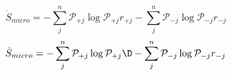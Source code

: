 \begin{equation}
\dot S_{micro} = -\sum_j^n\mathcal P_{+j}\log\mathcal P_{+j}r_{+j} -\sum_j^n\mathcal P_{-j}\log\mathcal P_{-j} r_{-j}
\end{equation}
\begin{equation}
\dot S_{micro} = -\sum_j^n\mathcal P_{+j}\log\mathcal P_{+j}\D -\sum_j^n\mathcal P_{-j}\log\mathcal P_{-j} r_{-j}
\end{equation}